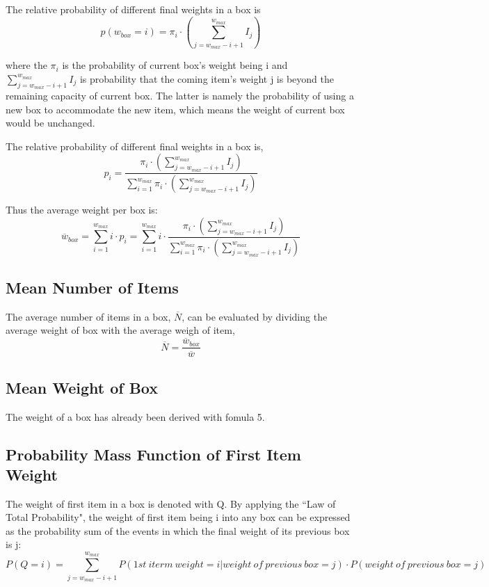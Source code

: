 \documentclass{article}
\begin{document}
The relative probability of different final weights in a box is 
\begin{equation}
    p(w_{box}=i)=\pi_i\cdot(\sum_{j=w_{max}-i+1}^{w_{max}}I_j)
\end{equation}

where the $\pi_i$ is the probability of current box's weight being i and $\sum_{j=w_{max}-i+1}^{w_{max}}I_j$ is probability that the coming item's weight j is beyond the remaining capacity of current box. The latter is namely the probability of using a new box to accommodate the new item, which means the weight of current box would be unchanged. 

The relative probability of different final weights in a box is, 
\begin{equation}
    p_i=\frac{\pi_i\cdot(\sum_{j=w_{max}-i+1}^{w_{max}}I_j)}{\sum_{i=1}^{w_{max}}\pi_i\cdot(\sum_{j=w_{max}-i+1}^{w_{max}}I_j)}
\end{equation}

Thus the average weight per box is:
\begin{equation}
    \overline{w}_{box}=\sum_{i=1}^{w_{max}}i\cdot p_i = \sum_{i=1}^{w_{max}}i\cdot\frac{\pi_i\cdot(\sum_{j=w_{max}-i+1}^{w_{max}}I_j)}{\sum_{i=1}^{w_{max}}\pi_i\cdot(\sum_{j=w_{max}-i+1}^{w_{max}}I_j)} 
\end{equation}

\subsection{Mean Number of Items}
\indent The average number of items in a box, $\overline{N}$, can be evaluated by dividing the average weight of box with the average weigh of item,
\begin{equation}
    \overline{N}=\frac{\overline{w}_{box}}{\overline{w}}
\end{equation}
\subsection{Mean Weight of Box}
The weight of a box has already been derived with fomula 5.

\subsection{Probability Mass Function of First Item Weight}
\indent The weight of first item in a box is denoted with Q. By applying the ``Law of Total Probability", the weight of first item being i into any box can be expressed as the probability sum of the events in which the final weight of its previous box is j:
\begin{equation}
    P(Q=i)=\sum_{j=w_{max}-i+1}^{w_{max}} P(1st\ iterm\ weight=i|weight\ of\ previous\ box=j)\cdot P(weight\ of\ previous\ box=j)
\end{equation}
\end{document}
